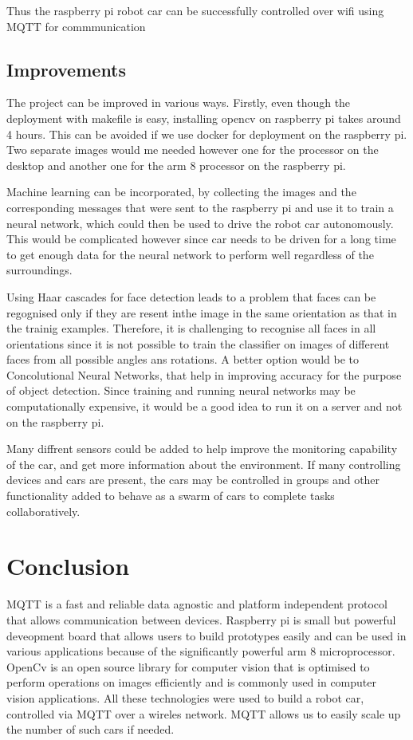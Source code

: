 \documentclass[sigconf]{acmart}
\begin{document}
Thus the raspberry pi robot car can be successfully controlled over wifi using MQTT for commmunication

\subsection{Improvements}

The project can be improved in various ways. Firstly, even though the deployment with makefile is easy, installing opencv on raspberry pi takes around 4 hours. This can be avoided if we use docker for deployment on the raspberry pi. Two separate images would me needed however one for the processor on the desktop and another one for the arm 8 processor on the raspberry pi.

Machine learning can be incorporated, by collecting the images and the corresponding messages that were sent to the raspberry pi and use it to train a neural network, which could then be used to drive the robot car autonomously. This would be complicated however since car needs to be driven for a long time to get enough data for the neural network to perform well regardless of the surroundings.

Using Haar cascades for face detection leads to a problem that faces can be regognised only if they are resent inthe image in the same orientation as that in the trainig examples. Therefore, it is challenging to recognise all faces in all orientations since it is not possible to train the classifier on images of different faces from all possible angles ans rotations. A better option would be to Concolutional Neural Networks, that help in improving accuracy for the purpose of object detection. Since training and running neural networks may be computationally expensive, it would be a good idea to run it on a server and not on the raspberry pi.

Many diffrent sensors could be added to help improve the monitoring capability of the car, and get more information about the environment.
If many controlling devices and cars are present, the cars may be controlled in groups and other functionality added to behave as a swarm of cars to complete tasks collaboratively.



\section{Conclusion}
MQTT is a fast and reliable data agnostic and platform independent protocol that allows communication between devices. Raspberry pi is small but powerful deveopment board that allows users to build prototypes easily and can be used in various applications because of the significantly powerful arm 8 microprocessor. OpenCv is an open source library for computer vision that is optimised to perform operations on images efficiently and is commonly used in computer vision applications. All these technologies were used to build a robot car, controlled via MQTT over a wireles network. MQTT allows us to easily scale up the number of such cars if needed.
\end{document}
